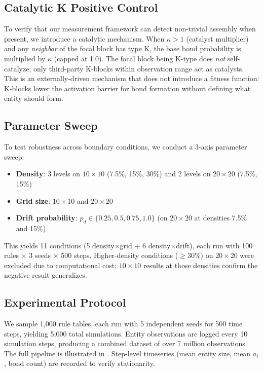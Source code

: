 \documentclass[letterpaper]{article}
\begin{document}
\subsection{Catalytic K Positive Control}

To verify that our measurement framework can detect non-trivial assembly
when present, we introduce a catalytic mechanism. When
$\kappa > 1$ (catalyst multiplier) and any \emph{neighbor} of the focal
block has type K, the base bond probability is multiplied by $\kappa$
(capped at 1.0). The focal block being K-type does \emph{not}
self-catalyze; only third-party K-blocks within observation range act
as catalysts. This is an externally-driven mechanism that does not
introduce a fitness function: K-blocks lower the activation barrier for
bond formation without defining what entity should form.

\subsection{Parameter Sweep}

To test robustness across boundary conditions, we conduct a 3-axis
parameter sweep:
\begin{itemize}
    \item \textbf{Density}: 3 levels on $10 \times 10$ (7.5\%, 15\%,
    30\%) and 2 levels on $20 \times 20$ (7.5\%, 15\%)
    \item \textbf{Grid size}: $10 \times 10$ and $20 \times 20$
    \item \textbf{Drift probability}: $p_d \in \{0.25, 0.5, 0.75, 1.0\}$
    (on $20 \times 20$ at densities 7.5\% and 15\%)
\end{itemize}
This yields 11 conditions (5 density$\times$grid + 6
density$\times$drift), each run with 100 rules $\times$ 3 seeds
$\times$ 500 steps. Higher-density conditions ($\geq 30\%$) on
$20 \times 20$ were excluded due to computational cost; $10 \times 10$
results at those densities confirm the negative result generalizes.

\subsection{Experimental Protocol}

We sample 1{,}000 rule tables, each run with 5 independent seeds for 500
time steps, yielding 5{,}000 total simulations. Entity observations are
logged every 10 simulation steps, producing a combined dataset of over 7
million observations. The full pipeline is illustrated in
. Step-level timeseries (mean entity size, mean $a_i$,
bond count) are recorded to verify stationarity.
\end{document}

